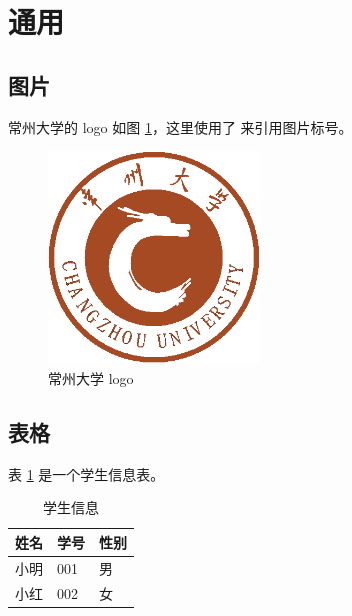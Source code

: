 \documentclass[a4paper, 11pt]{ctexart}
\begin{document}
\clearpage
\blankpage %

\clearpage
\tableofcontents
\thispagestyle{empty} %

\clearpage
\blankpage %

\clearpage
\setcounter{page}{1} %

\section{通用}

\subsection{图片}

常州大学的 logo 如图 \ref{fig:cczu}，这里使用了 \codeinline{\ref{fig:cczu}} 来引用图片标号。

\begin{figure}[htp]
    \centering\includegraphics[width=0.5\textwidth]{cczu}
    \caption{常州大学 logo}
    \label{fig:cczu}
\end{figure}

\subsection{表格}

表 \ref{tab:student-table} 是一个学生信息表。

\begin{table}[htp]
    \centering
    \begin{tabularx}{\textwidth}{XXX}
        \toprule  %
        姓名 & 学号 & 性别 \\
        \midrule  %
        小明 & 001  & 男   \\
        小红 & 002  & 女   \\
        \bottomrule %
    \end{tabularx}
    \caption{学生信息}
    \label{tab:student-table}
\end{table}
\end{document}
